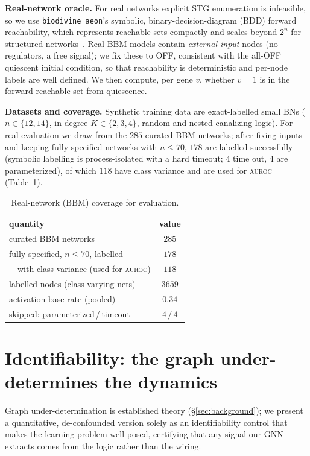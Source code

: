 \documentclass[journal]{IEEEtran}
\newcommand{\auroc}{\textsc{auroc}}
\begin{document}
\textbf{Real-network oracle.} For real networks explicit STG enumeration is infeasible,
so we use \texttt{biodivine\_aeon}'s symbolic, binary-decision-diagram (BDD) forward
reachability, which represents reachable sets compactly and scales beyond $2^n$ for
structured networks~\cite{aeon}. Real BBM models contain \emph{external-input} nodes
(no regulators, a free signal); we fix these to OFF, consistent with the all-OFF
quiescent initial condition, so that reachability is deterministic and per-node labels
are well defined. We then compute, per gene $v$, whether $v=1$ is in the forward-reachable
set from quiescence.

\textbf{Datasets and coverage.} Synthetic training data are exact-labelled small BNs
($n\in\{12,14\}$, in-degree $K\in\{2,3,4\}$, random and nested-canalizing logic). For
real evaluation we draw from the $285$ curated BBM networks; after fixing inputs and
keeping fully-specified networks with $n\le70$, $178$ are labelled successfully
(symbolic labelling is process-isolated with a hard timeout; $4$ time out, $4$ are
parameterized), of which $118$ have class variance and are used for \auroc{}
(Table~\ref{tab:coverage}).

\begin{table}[t]
\caption{Real-network (BBM) coverage for evaluation.}
\label{tab:coverage}
\centering
\begin{tabular}{lc}
\toprule
quantity & value\\
\midrule
curated BBM networks & $285$\\
fully-specified, $n\le70$, labelled & $178$\\
\ \ with class variance (used for \auroc{}) & $118$\\
labelled nodes (class-varying nets) & $3659$\\
activation base rate (pooled) & $0.34$\\
skipped: parameterized\,/\,timeout & $4\,/\,4$\\
\bottomrule
\end{tabular}
\end{table}

\section{Identifiability: the graph under-determines the dynamics}
\label{sec:identifiability}
Graph under-determination is established theory (\S\ref{sec:background}); we present a
quantitative, de-confounded version solely as an identifiability control that makes the
learning problem well-posed, certifying that any signal our GNN extracts comes from the
logic rather than the wiring.
\end{document}
